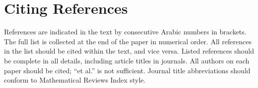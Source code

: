 \documentclass{ijuc}
\begin{document}
\section{Citing References}

References are indicated in the text by consecutive Arabic numbers
in brackets. The full list is collected at the end of the paper in numerical
order. All references in the list should be cited within the text, and vice
versa. Listed references should be complete in all details, including article
titles in journals. All authors on each paper should be cited; ``et al.'' is not sufficient.
Journal title abbreviations should conform to Mathematical Reviews
Index style.




\appendix 
\end{document}
